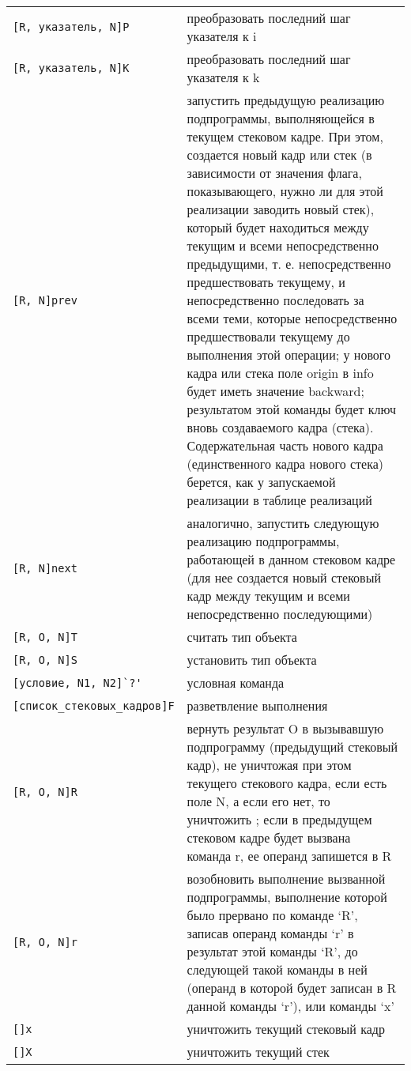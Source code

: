 \documentclass{report}
\begin{document}
\begin{tabular}{|l|p{10cm}|}
        \verb|[R, указатель, N]P|&преобразовать последний шаг указателя к i\\
        \verb|[R, указатель, N]K|&преобразовать последний шаг указателя к k\\
        \verb|[R, N]prev|&запустить предыдущую реализацию подпрограммы, выполняющейся в текущем стековом кадре. При этом, создается новый кадр или стек (в зависимости от значения флага, показывающего, нужно ли для этой реализации заводить новый стек), который будет находиться между текущим и всеми непосредственно предыдущими, т. е. непосредственно предшествовать текущему, и непосредственно последовать за всеми теми, которые непосредственно предшествовали текущему до выполнения этой операции; у нового кадра или стека поле origin в info будет иметь значение backward; результатом этой команды будет ключ вновь создаваемого кадра (стека). Содержательная часть нового кадра (единственного кадра нового стека) берется, как у запускаемой реализации в таблице реализаций\\
        \verb|[R, N]next|&аналогично, запустить следующую реализацию подпрограммы, работающей в данном стековом кадре (для нее создается новый стековый кадр между текущим и всеми непосредственно последующими)\\
        \verb|[R, O, N]T|&считать тип объекта\\
        \verb|[R, O, N]S|&установить тип объекта\\
        \hline
        \verb|[условие, N1, N2]`?'|&условная команда\\
        \hline
        \verb|[список_стековых_кадров]F|&разветвление выполнения\\
        \verb|[R, O, N]R|&вернуть результат O в вызывавшую подпрограмму (предыдущий стековый кадр), не уничтожая при этом текущего стекового кадра, если есть поле N, а если его нет, то уничтожить ; если в предыдущем стековом кадре будет вызвана команда r, ее операнд запишется в R\\
        \verb|[R, O, N]r|&возобновить выполнение вызванной подпрограммы, выполнение которой было прервано по команде `R', записав операнд команды `r' в результат этой команды `R', до следующей такой команды в ней (операнд в которой будет записан в R данной команды `r'), или команды `x'\\
        \verb|[]x|&уничтожить текущий стековый кадр\\
        \verb|[]X|&уничтожить текущий стек\\

\end{tabular}
\end{document}
